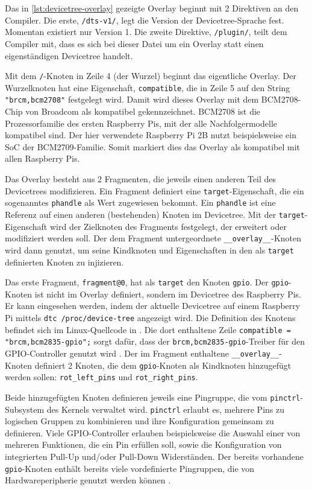 \documentclass[german]{thesis_KBS}
\newcommand{\code}[1]{\texttt{#1}}  %
\begin{document}

Das in \autoref{lst:devicetree-overlay} gezeigte Overlay beginnt mit 2
Direktiven an den Compiler. Die erste, \code{/dts-v1/}, legt die Version der
Devicetree-Sprache fest. Momentan existiert nur Version 1. Die zweite Direktive,
\code{/plugin/}, teilt dem Compiler mit, dass es sich bei dieser Datei um ein
Overlay statt einen eigenständigen Devicetree handelt.

Mit dem \code{/}-Knoten in Zeile 4 (der Wurzel) beginnt das eigentliche Overlay.
Der Wurzelknoten hat eine Eigenschaft, \code{compatible}, die in Zeile 5 auf den
String \code{"brcm,bcm2708"} festgelegt wird. Damit wird dieses Overlay mit dem
BCM2708-Chip von Broadcom als kompatibel gekennzeichnet. BCM2708 ist die
Prozessorfamilie des ersten Raspberry Pis, mit der alle Nachfolgermodelle
kompatibel sind. Der hier verwendete Raspberry Pi 2B nutzt beispielsweise ein
SoC der BCM2709-Familie. Somit markiert dies das Overlay als kompatibel mit
allen Raspberry Pis.

Das Overlay besteht aus 2 Fragmenten, die jeweils einen anderen Teil des
Devicetrees modifizieren. Ein Fragment definiert eine \code{target}-Eigenschaft,
die ein sogenanntes \code{phandle} als Wert zugewiesen bekommt. Ein
\code{phandle} ist eine Referenz auf einen anderen (bestehenden) Knoten im
Devicetree. Mit der \code{target}-Eigenschaft wird der Zielknoten des Fragments
festgelegt, der erweitert oder modifiziert werden soll. Der dem Fragment
untergeordnete \code{\_\_overlay\_\_}-Knoten wird dann genutzt, um seine
Kindknoten und Eigenschaften in den als \code{target} definierten Knoten zu
injizieren.

Das erste Fragment, \code{fragment@0}, hat als \code{target} den Knoten
\code{gpio}. Der \code{gpio}-Knoten ist nicht im Overlay definiert, sondern im
Devicetree des Raspberry Pis. Er kann eingesehen werden, indem der aktuelle
Devicetree auf einem Raspberry Pi mittels \code{dtc /proc/device-tree} angezeigt
wird. Die Definition des Knotens befindet sich im Linux-Quellcode in
 \cite{devicetree-pi-gpio}. Die dort
enthaltene Zeile \code{compatible = "brcm,bcm2835-gpio";} sorgt dafür, dass der
\code{brcm,bcm2835-gpio}-Treiber für den GPIO-Controller genutzt wird
\cite{devicetree-bcmgpio}. Der im Fragment enthaltene
\code{\_\_overlay\_\_}-Knoten definiert 2 Knoten, die dem \code{gpio}-Knoten als
Kindknoten hinzugefügt werden sollen: \code{rot\_left\_pins} und
\code{rot\_right\_pins}.

Beide hinzugefügten Knoten definieren jeweils eine Pingruppe, die vom
\code{pinctrl}-Subsystem des Kernels verwaltet wird. \code{pinctrl} erlaubt es,
mehrere Pins zu logischen Gruppen zu kombinieren und ihre Konfiguration
gemeinsam zu definieren. Viele GPIO-Controller erlauben beispielsweise die
Auswahl einer von mehreren Funktionen, die ein Pin erfüllen soll, sowie die
Konfiguration von integrierten Pull-Up und/oder Pull-Down Widerständen. Der
bereits vorhandene \code{gpio}-Knoten enthält bereits viele vordefinierte
Pingruppen, die von Hardwareperipherie genutzt werden können
\cite{devicetree-pi-gpio}.
\end{document}
